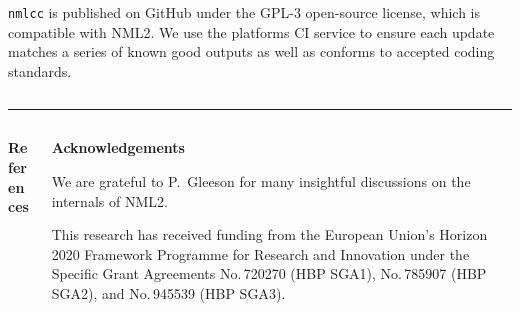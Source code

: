 \documentclass{beamer}
\begin{document}
\begin{frame}[t, fragile]
\begin{columns}[t]
\begin{column}[t]{0.49\textwidth}
      \texttt{nmlcc} is published on GitHub under the GPL-3 open-source license,
      which is compatible with NML2. We use the platforms CI service to ensure
      each update matches a series of known good outputs as well as conforms to
      accepted coding standards.
    \end{column}
  \end{columns}
  \vspace*{1ex}
  \textcolor{arbgrey}{\rule{\textwidth}{0.5ex}}
  \vspace*{-1ex}
  \begin{columns}
    \begin{column}{0.49\textwidth}
      \textbf{References}
    \end{column}
    \begin{column}{0.49\textwidth}
      \textbf{Acknowledgements}

      We are grateful to P.~Gleeson for many insightful discussions on the
      internals of NML2.

      This research has received funding from the European Union's Horizon 2020
      Framework Programme for Research and Innovation under the Specific Grant
      Agreements No.\,720270 (HBP SGA1), No.\,785907 (HBP SGA2), and No.\,945539
      (HBP SGA3).
    \end{column}
  \end{columns}
\end{frame}
\end{document}
